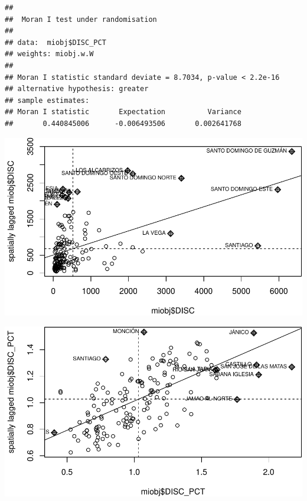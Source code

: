 \documentclass[11pt,]{article}
\newenvironment{Shaded}{\begin{snugshade}}{\end{snugshade}}
\newcommand{\KeywordTok}[1]{\textcolor[rgb]{0.13,0.29,0.53}{\textbf{#1}}}
\newcommand{\DataTypeTok}[1]{\textcolor[rgb]{0.13,0.29,0.53}{#1}}
\newcommand{\OperatorTok}[1]{\textcolor[rgb]{0.81,0.36,0.00}{\textbf{#1}}}
\newcommand{\NormalTok}[1]{#1}
\begin{document}
\begin{verbatim}
## 
##  Moran I test under randomisation
## 
## data:  miobj$DISC_PCT  
## weights: miobj.w.W    
## 
## Moran I statistic standard deviate = 8.7034, p-value < 2.2e-16
## alternative hypothesis: greater
## sample estimates:
## Moran I statistic       Expectation          Variance 
##       0.440845006      -0.006493506       0.002641768
\end{verbatim}

\begin{Shaded}
\end{Shaded}

\includegraphics{proyecto_files/figure-latex/unnamed-chunk-24-1.pdf}

\begin{Shaded}
\end{Shaded}

\includegraphics{proyecto_files/figure-latex/unnamed-chunk-24-2.pdf}
\end{document}
